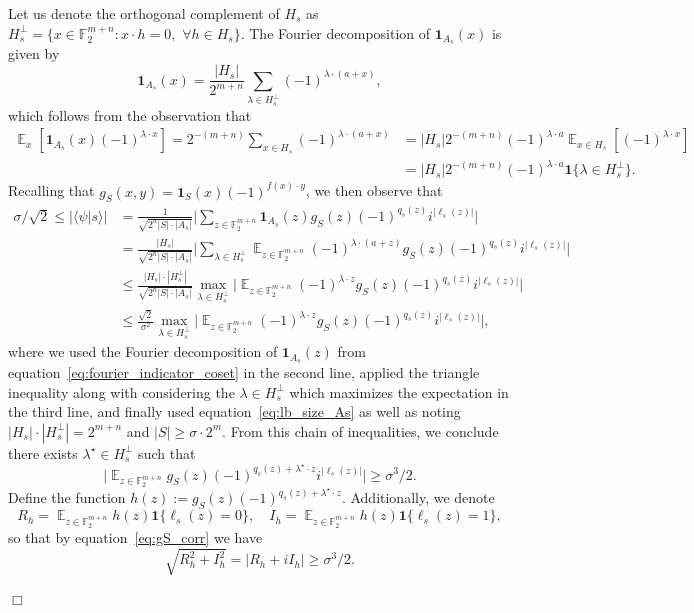 \documentclass[11pt]{amsart}
\newcommand{\Exp}{\mathop{\mathbb{E}}}
\newcommand{\F}{\mathbb{F}} %
\newcommand{\one}{\mathbf{1}}
\newcommand{\ra}{\rangle}
\newcommand{\la}{\langle}
\theoremstyle{plain}
\theoremstyle{definition}
\theoremstyle{remark}
\renewenvironment{proof}[1][]{
    	\begin{trivlist}
     	\item[\hspace{\labelsep}{\em\noindent Proof#1:\/}]}
     	{{\hfill$\Box$}
    	\end{trivlist}
  }
\begin{document}
\begin{proof}[ of Lemma~\ref{lem:findingfreimanquantum}]
Let us denote the orthogonal complement of $H_s$ as $H_s^\perp = \{x \in \F_2^{m+n} : x \cdot h = 0, \,\,\forall h \in H_s\}$. The Fourier decomposition of $\one_{A_s}(x)$ is given by
\begin{equation}\label{eq:fourier_indicator_coset}
\one_{A_s}(x) = \frac{|H_s|}{2^{m+n}}\sum_{\lambda \in H_s^\perp} (-1)^{\lambda \cdot (a+x)},    
\end{equation}
which follows from the observation that
\begin{align*}
\Exp_x[\one_{A_s}(x) (-1)^{\lambda \cdot x}] = 2^{-(m+n)} \sum_{x \in H_s} (-1)^{\lambda \cdot (a+x)} 
&= |H_s| 2^{-(m+n)} (-1)^{\lambda \cdot a} \Exp_{x \in H_s}[(-1)^{\lambda \cdot x}] \\
&= |H_s| 2^{-(m+n)} (-1)^{\lambda \cdot a} \one\{\lambda \in H_s^\perp\}.    
\end{align*}
Recalling that $g_S(x,y) = \one_S(x) (-1)^{f(x)\cdot y}$, we then observe that
\begin{align*}
    \sigma/\sqrt{2} \leq |\la \psi | s \ra |
    &= \frac{1}{\sqrt{2^n |S|\cdot |A_s|}} \Big| \sum_{z \in \F_2^{m+n}} \one_{A_s}(z) g_S(z) (-1)^{q_s(z)} i^{|\ell_s(z)|} \Big| \\
    &= \frac{|H_s|}{\sqrt{2^n |S|\cdot |A_s|}} \Big| \sum_{\lambda \in H_s^\perp} \Exp_{z \in \F_2^{m+n}} (-1)^{\lambda \cdot (a+z)} g_S(z) (-1)^{q_s(z)} i^{|\ell_s(z)|} \Big| \\
    &\leq \frac{|H_s|\cdot|H_s^\perp|}{\sqrt{2^n |S|\cdot |A_s|}} \max_{\lambda \in H_s^\perp} \Big|  \Exp_{z \in \F_2^{m+n}} (-1)^{\lambda \cdot z} g_S(z) (-1)^{q_s(z)} i^{|\ell_s(z)|} \Big| \\
    &\leq \frac{\sqrt{2}}{\sigma^{2}} \max_{\lambda \in H_s^\perp} \Big|  \Exp_{z \in \F_2^{m+n}} (-1)^{\lambda \cdot z} g_S(z) (-1)^{q_s(z)} i^{|\ell_s(z)|} \Big|,
\end{align*}
where we used the Fourier decomposition of $\one_{A_s}(z)$ from equation~\eqref{eq:fourier_indicator_coset} in the second line, applied the triangle inequality along with considering the $\lambda \in H_s^\perp$ which maximizes the expectation in the third line, and finally used equation~\eqref{eq:lb_size_As} as well as noting $|H_s|\cdot|H_s^\perp| = 2^{m+n}$ and $|S|\geq \sigma \cdot 2^m$.
From this chain of inequalities, we conclude there exists $\lambda^\star \in H_s^\perp$ such that
\begin{equation} \label{eq:gS_corr}
    \Big|  \Exp_{z \in \F_2^{m+n}} g_S(z) (-1)^{q_s(z) + \lambda^\star \cdot z} i^{|\ell_s(z)|} \Big| \geq \sigma^{3}/2.
\end{equation}
Define the function $h(z) := g_S(z) (-1)^{q_s(z) + \lambda^\star \cdot z}$.
Additionally, we denote
\begin{equation*}
    R_h = \Exp_{z\in \F_2^{m+n}} h(z) \one\{\ell_s(z)=0\}, \quad I_h = \Exp_{z\in \F_2^{m+n}} h(z) \one\{\ell_s(z)=1\},
\end{equation*}
so that by equation~\eqref{eq:gS_corr} we have
$$\sqrt{R_h^2 + I_h^2} = |R_h + iI_h| \geq \sigma^{3}/2.$$


\end{proof}
\end{document}
